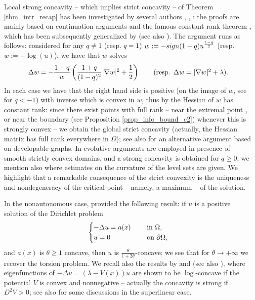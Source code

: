 \documentclass[11pt, reqno]{amsart}
\theoremstyle{definition}
\numberwithin{equation}{section}
\begin{document}
Local strong concavity -- which implies strict concavity -- of Theorem \ref{thm_intr_recap} has been investigated by several authors \cite{APP81, SWYY85}, \cite[Theorem 4.4 and Corollary 4.6]{CaFr85}, \cite[Corollary 3.6]{BGP99}: the proofs are mainly based on continuation arguments and the famous constant rank theorem \cite[Theorem 1.1]{CaFr85}, which has been subsequently generalized by \cite{KoLe87} (see also \cite{BiGu09}). 
The argument runs as follows: considered for any $q\neq 1$ (resp. $q=1$) $w := -\textup{sign}(1-q) u^{\frac{1-q}{2}}$ (resp. $w:=-\log(u)$), we have that $w$ solves
\begin{equation}
\label{eq_intro_transformed}
\Delta w =-\frac{1-q}{w} \left(\frac{1+q}{(1-q)^2}|\nabla w|^2 + \frac{1}{2}\right) \qquad \hbox{(resp. $\Delta w = |\nabla w|^2 + \lambda $).}
\end{equation}
In each case we have that the right hand side is positive (on the image of $w$, see \cite[Lemma 3.1]{BGP99} for $q<-1$) with inverse which is convex in $w$, thus by \cite{KoLe87} the Hessian of $w$ has constant rank: since there exist points with full rank -- near the extremal point \cite[Lemma at page 207]{Bas76}, or near the boundary (see Proposition \ref{prop_info_bound_c2}) whenever this is strongly convex -- we obtain the global strict concavity (actually, the Hessian matrix has full rank everywhere in $\Omega$); see also \cite[page 80]{BMS23} for an alternative argument based on developable graphs. 
In \cite[Lemmas 2.5, 3.6 and 4.8]{LeVa08} evolutive arguments are employed in presence of smooth strictly convex domains, and a strong concavity is obtained for $q\geq 0$; we mention also \cite{APP81, MSY12} where estimates on the curvature of the level sets are given. 
We highlight that a remarkable consequence of the strict convexity is the uniqueness and nondegeneracy of the critical point -- namely, a maximum -- of the solution. 

\smallskip

In the nonautonomous case, \cite[Theorem 4.1]{Ken85} provided the following result: if $u$ is a positive solution of the Dirichlet problem
$$ \begin{cases}
-\Delta u = a(x) & \quad \hbox{ in $\Omega$},\\ 
u =0 & \quad \hbox{ on $\partial \Omega$},
\end{cases}$$
and $a(x)$ is $\theta\geq 1$ concave, then $u$ is $\frac{\theta}{1+2\theta}$-concave; we see that for $\theta \to +\infty$ we recover the torsion problem.
We recall also the results by \cite[Theorem 6.1]{BrLi76} and \cite[Appendix]{SWYY85} (see also \cite{KST24}), where eigenfunctions of $-\Delta u = (\lambda-V(x))u$ are shown to be $\log$-concave if the potential $V$ is convex and nonnegative -- actually the concavity is strong if $D^2 V>0$; see also \cite{Gom07} for some discussions in the superlinear case.
\end{document}
